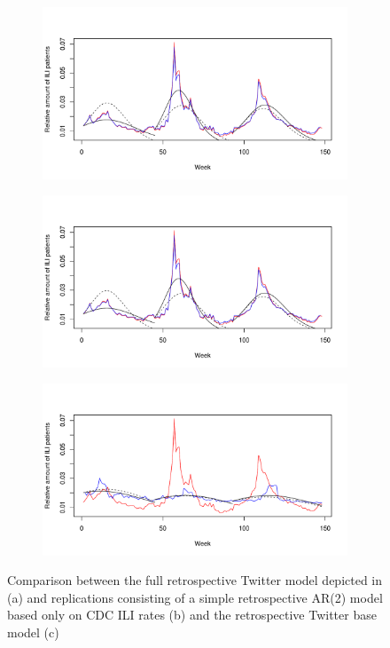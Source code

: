 \documentclass[11pt, a4paper]{report}\usepackage[]{graphicx}\usepackage[]{color}
\begin{document}
\begin{figure}[H]
\centering
  \begin{subfigure}[t]{0.65\textwidth}
  \includegraphics[width=1\linewidth,height=0.5\linewidth]{SIR_model_full_both_25_colorised.pdf}
  \caption{}
  \label{fig:TwitterModel_comparison_original}
  \end{subfigure}
  
  \begin{subfigure}[t]{0.6\textwidth}
  \includegraphics[width=1\linewidth,height=0.5\linewidth]{SIR_model_full_AR2_100_colorised.pdf}
  \caption{}
  \label{fig:TwitterModel_comparison_base_model}
  \end{subfigure}
  
  \begin{subfigure}[t]{0.6\textwidth}
  \includegraphics[width=1\linewidth,height=0.5\linewidth]{SIR_model_full_base_model_100_colorised.pdf}
  \caption{}
  \label{fig:TwitterModel_comparison_AR2}
  \end{subfigure}
  \caption{Comparison between the full retrospective Twitter model depicted in \citep{bodnar_data_2015} (a) and replications consisting of a simple retrospective AR(2) model based only on CDC ILI rates (b) and the retrospective Twitter base model (c)}
  \label{fig:TwitterModel_comparison}
\end{figure}
\end{document}
